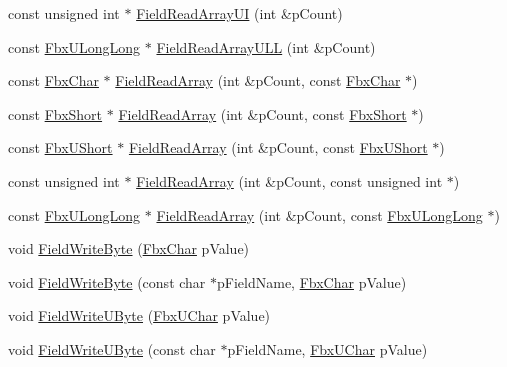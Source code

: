 \begin{Indent}
\begin{DoxyCompactItemize}
\item 
const unsigned int $\ast$ \hyperlink{class_fbx_i_o_ab6ea514d2f3de0ad07810f6e1e980570}{Field\+Read\+Array\+UI} (int \&p\+Count)
\item 
const \hyperlink{fbxtypes_8h_a267f848573cc1e685aa510be4b1298c8}{Fbx\+U\+Long\+Long} $\ast$ \hyperlink{class_fbx_i_o_a45c8b973c49088a32c277dfa25fb2b92}{Field\+Read\+Array\+U\+LL} (int \&p\+Count)
\item 
const \hyperlink{fbxtypes_8h_a34067dfe395a7cf3040b7b263c9024d2}{Fbx\+Char} $\ast$ \hyperlink{class_fbx_i_o_a3a402fac044c78be40f2079bdbcc7336}{Field\+Read\+Array} (int \&p\+Count, const \hyperlink{fbxtypes_8h_a34067dfe395a7cf3040b7b263c9024d2}{Fbx\+Char} $\ast$)
\item 
const \hyperlink{fbxtypes_8h_a56e7a4f56baf132527df7c3cd07017b7}{Fbx\+Short} $\ast$ \hyperlink{class_fbx_i_o_a6bd6a4d6b1176f7eb599504dfe32125d}{Field\+Read\+Array} (int \&p\+Count, const \hyperlink{fbxtypes_8h_a56e7a4f56baf132527df7c3cd07017b7}{Fbx\+Short} $\ast$)
\item 
const \hyperlink{fbxtypes_8h_a321ef060885fc068fd77ac69a49f51d9}{Fbx\+U\+Short} $\ast$ \hyperlink{class_fbx_i_o_a98c8d9a4895af33ef93b508e93d787f3}{Field\+Read\+Array} (int \&p\+Count, const \hyperlink{fbxtypes_8h_a321ef060885fc068fd77ac69a49f51d9}{Fbx\+U\+Short} $\ast$)
\item 
const unsigned int $\ast$ \hyperlink{class_fbx_i_o_ae6f494d986e3550a15c2fe9b28a960a2}{Field\+Read\+Array} (int \&p\+Count, const unsigned int $\ast$)
\item 
const \hyperlink{fbxtypes_8h_a267f848573cc1e685aa510be4b1298c8}{Fbx\+U\+Long\+Long} $\ast$ \hyperlink{class_fbx_i_o_a6f005d982d421a395c0ca43ba506bd40}{Field\+Read\+Array} (int \&p\+Count, const \hyperlink{fbxtypes_8h_a267f848573cc1e685aa510be4b1298c8}{Fbx\+U\+Long\+Long} $\ast$)
\item 
void \hyperlink{class_fbx_i_o_a73b664f7b0ecb1108062fc5151229d76}{Field\+Write\+Byte} (\hyperlink{fbxtypes_8h_a34067dfe395a7cf3040b7b263c9024d2}{Fbx\+Char} p\+Value)
\item 
void \hyperlink{class_fbx_i_o_a8a1695ebbccdc5848487c67188c87c39}{Field\+Write\+Byte} (const char $\ast$p\+Field\+Name, \hyperlink{fbxtypes_8h_a34067dfe395a7cf3040b7b263c9024d2}{Fbx\+Char} p\+Value)
\item 
void \hyperlink{class_fbx_i_o_a797df2cffb604c4563c66e5a8da70837}{Field\+Write\+U\+Byte} (\hyperlink{fbxtypes_8h_a1be3cadf61e76f49142eb83e66ffe8bd}{Fbx\+U\+Char} p\+Value)
\item 
void \hyperlink{class_fbx_i_o_aec40b520ebc6bb80daf1cd76d46a102b}{Field\+Write\+U\+Byte} (const char $\ast$p\+Field\+Name, \hyperlink{fbxtypes_8h_a1be3cadf61e76f49142eb83e66ffe8bd}{Fbx\+U\+Char} p\+Value)

\end{DoxyCompactItemize}
\end{Indent}
